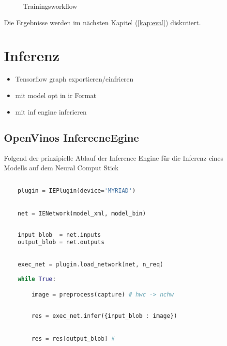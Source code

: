 %     


\begin{figure}[H]
    \centering
    
    \caption{Trainingsworkflow}
    \label{fig:train_workflow}
\end{figure}


Die Ergebnisse werden im nächsten Kapitel (\ref{kap:eval}) diskutiert.

\section{Inferenz}

\begin{itemize}
    \item Tensorflow graph exportieren/einfrieren
    \item mit model opt in ir Format
    \item mit inf engine inferieren
\end{itemize}


\subsection{OpenVinos InferecneEgine}

Folgend der prinzipielle Ablauf der Inference Engine für 
die Inferenz eines Modells auf dem Neural Comput Stick


\begin{minipage}{0.30\textwidth}
    \centering
    
    \label{}
\end{minipage}
\begin{minipage}{0.70\textwidth}

\begin{lstlisting}[language=Python]

    plugin = IEPlugin(device='MYRIAD')

        
    net = IENetwork(model_xml, model_bin)
        
    
    input_blob  = net.inputs
    output_blob = net.outputs
        

    exec_net = plugin.load_network(net, n_req)
        
    while True:

        image = preprocess(capture) # hwc -> nchw
        
        
        res = exec_net.infer({input_blob : image})
        

        res = res[output_blob] #
        
        
\end{lstlisting}
\vspace{1.5cm}
\end{minipage}

